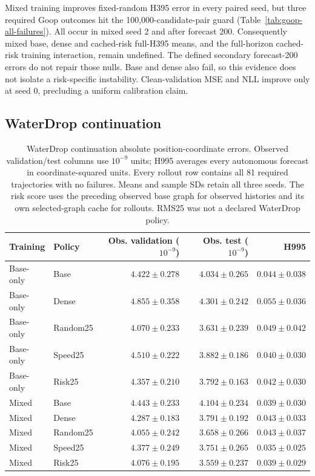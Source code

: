 Mixed training improves fixed-random H395 error in every paired seed, but three required Goop outcomes hit the 100,000-candidate-pair guard (Table~\ref{tab:goop-all-failures}). All occur in mixed seed 2 and after forecast 200. Consequently mixed base, dense and cached-risk full-H395 means, and the full-horizon cached-risk training interaction, remain undefined. The defined secondary forecast-200 errors do not repair those nulls. Base and dense also fail, so this evidence does not isolate a risk-specific instability. Clean-validation MSE and NLL improve only at seed 0, precluding a uniform calibration claim.

\subsection{WaterDrop continuation}
\label{sec:waterdrop-110k-exposure}
\begin{table}[!ht]
\centering\small
\setlength{\tabcolsep}{5pt}\renewcommand{\arraystretch}{1.12}
\caption{WaterDrop continuation absolute position-coordinate errors. Observed validation/test columns use $10^{-9}$ units; H995 averages every autonomous forecast in coordinate-squared units. Every rollout row contains all 81 required trajectories with no failures. Means and sample SDs retain all three seeds. The risk score uses the preceding observed base graph for observed histories and its own selected-graph cache for rollouts. RMS25 was not a declared WaterDrop policy.}
\label{tab:waterdrop110k-observed}
\label{tab:waterdrop110k-rollout}
\begin{tabular}{llrrr}
\toprule
Training & Policy & Obs. validation ($10^{-9}$) & Obs. test ($10^{-9}$) & H995\\
\midrule
Base-only & Base & $4.422\pm0.278$ & $4.034\pm0.265$ & $0.044\pm0.038$\\
Base-only & Dense & $4.855\pm0.358$ & $4.301\pm0.242$ & $0.055\pm0.036$\\
Base-only & Random25 & $4.070\pm0.233$ & $3.631\pm0.239$ & $0.049\pm0.042$\\
Base-only & Speed25 & $4.510\pm0.222$ & $3.882\pm0.186$ & $0.040\pm0.030$\\
Base-only & Risk25 & $4.357\pm0.210$ & $3.792\pm0.163$ & $0.042\pm0.030$\\
Mixed & Base & $4.443\pm0.233$ & $4.104\pm0.234$ & $0.039\pm0.030$\\
Mixed & Dense & $4.287\pm0.183$ & $3.791\pm0.192$ & $0.043\pm0.033$\\
Mixed & Random25 & $4.055\pm0.242$ & $3.658\pm0.266$ & $0.043\pm0.037$\\
Mixed & Speed25 & $4.377\pm0.249$ & $3.751\pm0.265$ & $0.035\pm0.025$\\
Mixed & Risk25 & $4.076\pm0.195$ & $3.559\pm0.237$ & $0.039\pm0.029$\\
\bottomrule
\end{tabular}
\end{table}

